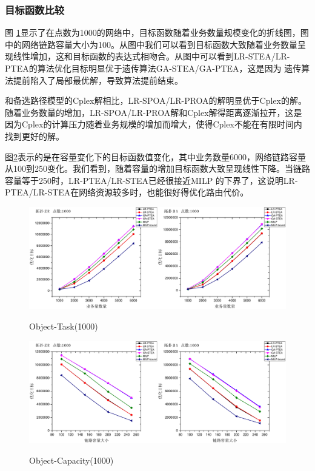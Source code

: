\subsubsection{目标函数比较}
图 \ref{OB-TA}显示了在点数为1000的网络中，目标函数随着业务数量规模变化的折线图，图中的网络链路容量大小为100。从图中我们可以看到目标函数大致随着业务数量呈现线性增加，这和目标函数的表达式相吻合。从图中可以看到LR-STEA/LR-PTEA的算法优化目标明显优于遗传算法GA-STEA/GA-PTEA，这是因为 遗传算法提前陷入了局部最优解，导致算法提前结束。

和备选路径模型的Cplex解相比，LR-SPOA/LR-PROA的解明显优于Cplex的解。随着业务数量的增加，LR-SPOA/LR-PROA解和Cplex解得距离逐渐拉开，这是因为Cplex的计算压力随着业务规模的增加而增大，使得Cplex不能在有限时间内找到更好的解。

图\ref{OB-CA}表示的是在容量变化下的目标函数值变化，其中业务数量6000，网络链路容量从100到250变化。我们看到，随着容量的增加目标函数大致呈现线性下降。当链路容量等于250时，LR-PTEA/LR-STEA已经很接近MILP 的下界了，这说明LR-PTEA/LR-STEA在网络资源较多时，也能很好得优化路由代价。
\begin{figure}
\setlength{\belowcaptionskip}{-0.1cm}
\begin{center}
{\includegraphics[width=0.8 \textwidth]{figures/OB-TA.pdf}}
\end{center}
\caption{{\footnotesize{Object-Task(1000)}}}
\label{OB-TA}
\end{figure}
\begin{figure}
\setlength{\belowcaptionskip}{-0.1cm}
\begin{center}
{\includegraphics[width=0.8 \textwidth]{figures/OB-CA.pdf}}
\end{center}
\caption{{\footnotesize{Object-Capacity(1000)}}}
\label{OB-CA}
\end{figure}
